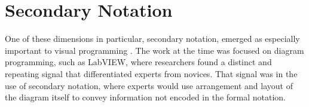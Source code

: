 

\section{Secondary Notation} %
\label{sec:secondary-notation}
One of these dimensions in particular, secondary notation, emerged as especially important to visual programming \citep{petre-2006}. The work at the time was focused on diagram programming, such as LabVIEW, where researchers found a distinct and repeating signal that differentiated experts from novices. That signal was in the use of secondary notation, where experts would use arrangement and layout of the diagram itself to convey information not encoded in the formal notation. 

